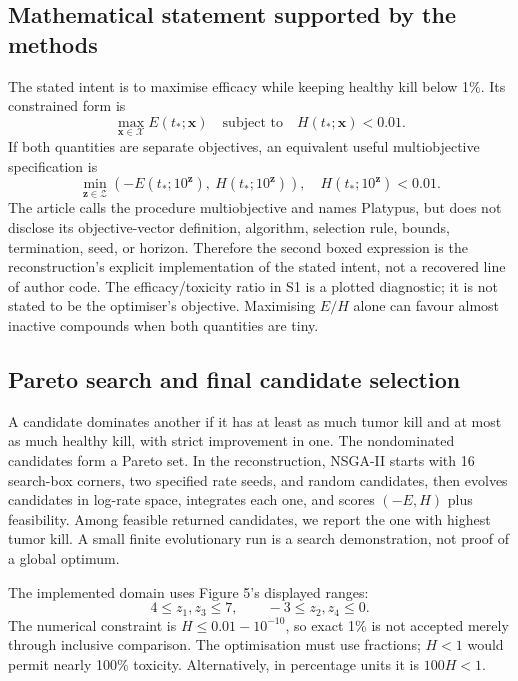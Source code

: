 \documentclass[11pt,a4paper]{article}
\begin{document}
\subsection{Mathematical statement supported by the methods}
The stated intent is to maximise efficacy while keeping healthy kill below 1\%. Its constrained form is
\begin{equation}\boxed{
 \max_{\boldsymbol x\in\mathcal X} E(t_*;\boldsymbol x)
 \quad\text{subject to}\quad H(t_*;\boldsymbol x)<0.01.}
\end{equation}
If both quantities are separate objectives, an equivalent useful multiobjective specification is
\begin{equation}\boxed{
 \min_{\boldsymbol z\in\mathcal Z}
 \left(-E(t_*;10^{\boldsymbol z}),\ H(t_*;10^{\boldsymbol z})\right),
 \quad H(t_*;10^{\boldsymbol z})<0.01.}
\end{equation}
The article calls the procedure multiobjective and names Platypus, but does not disclose its objective-vector definition, algorithm, selection rule, bounds, termination, seed, or horizon. Therefore the second boxed expression is the reconstruction's explicit implementation of the stated intent, not a recovered line of author code. The efficacy/toxicity ratio in S1 is a plotted diagnostic; it is not stated to be the optimiser's objective. Maximising $E/H$ alone can favour almost inactive compounds when both quantities are tiny.

\subsection{Pareto search and final candidate selection}
A candidate dominates another if it has at least as much tumor kill and at most as much healthy kill, with strict improvement in one. The nondominated candidates form a Pareto set. In the reconstruction, NSGA-II starts with 16 search-box corners, two specified rate seeds, and random candidates, then evolves candidates in log-rate space, integrates each one, and scores $(-E,H)$ plus feasibility. Among feasible returned candidates, we report the one with highest tumor kill. A small finite evolutionary run is a search demonstration, not proof of a global optimum.

The implemented domain uses Figure 5's displayed ranges:
\begin{equation}
 4\le z_1,z_3\le7,\qquad -3\le z_2,z_4\le0.
\end{equation}
The numerical constraint is $H\le0.01-10^{-10}$, so exact 1\% is not accepted merely through inclusive comparison. The optimisation must use fractions; $H<1$ would permit nearly 100\% toxicity. Alternatively, in percentage units it is $100H<1$.
\end{document}
